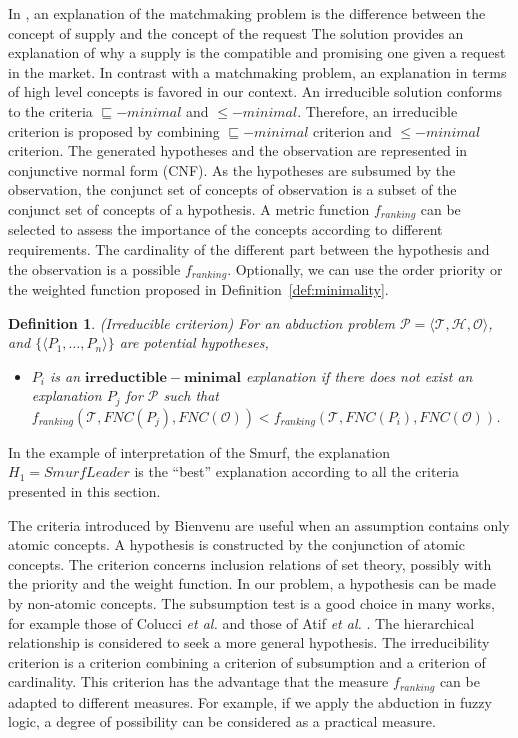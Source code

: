 \documentclass{article}
\newtheorem{mydef}{Definition}
\begin{document}
In \cite{di2007semantic}, an explanation of the matchmaking problem is the difference between the concept of supply and the concept of the request
The solution provides an explanation of why a supply is the compatible and promising one given a request in the market.
In contrast with a matchmaking problem, an explanation in terms of high level concepts is favored in our context. 
An irreducible solution conforms to the criteria $\sqsubseteq-minimal$ and $\leq -minimal$.
Therefore, an irreducible criterion is proposed by combining $\sqsubseteq-minimal$ criterion and $\leq-minimal$ criterion.
The generated hypotheses and the observation are represented in conjunctive normal form (CNF).
As the hypotheses are subsumed by the observation, the conjunct set of concepts of observation is a subset of the conjunct set of concepts of a hypothesis.
A metric function $f_{ranking}$ can be selected to assess the importance of the concepts according to different requirements. The cardinality of the different part between the hypothesis
and the observation is a possible $f_{ranking}$. Optionally, we can use the order priority or the weighted function proposed in Definition~\ref{def:minimality}.
\begin{mydef}{(Irreducible criterion)}
For an abduction problem $\mathcal{P}=\langle \mathcal{T},\mathcal{H}, \mathcal{O}\rangle$, and $\{\langle P_{1},\dots,P_{n}\rangle\}$ are potential hypotheses,
\begin{itemize}
\item  $P_{i}$ is an $\bm{irreductible-minimal}$ explanation if there does not exist an explanation $P_{j}$ for $\mathcal{P}$ such that $f_{ranking}(\mathcal{T},FNC(P_{j}),FNC(\mathcal{O})) 
< f_{ranking}(\mathcal{T},FNC(P_{i}),FNC(\mathcal{O}))$.
\end{itemize}
\end{mydef}
In the example of interpretation of the Smurf, the explanation $H_1=SmurfLeader$ is the ``best'' explanation according to all the criteria presented
in this section.

The criteria introduced by Bienvenu are useful when an assumption contains only atomic concepts. A hypothesis is constructed by the conjunction of atomic concepts.
The criterion concerns inclusion relations of set theory, possibly with the priority and the weight function.
In our problem, a hypothesis can be made by non-atomic concepts. 
The subsumption test is a good choice in many works,
for example those of Colucci \textit{et al.} \cite{colucci2004uniform} and those of Atif \textit{et al.}  \cite{atif2014explanatory}. 
The hierarchical relationship is considered to seek a more general hypothesis.
The irreducibility criterion is a criterion combining a criterion of subsumption and a criterion of cardinality. This criterion has the advantage that the measure $f_{ranking}$  can be adapted to different measures.
For example, if we apply the abduction in fuzzy logic, a degree of possibility can be considered as a practical measure.
\end{document}

